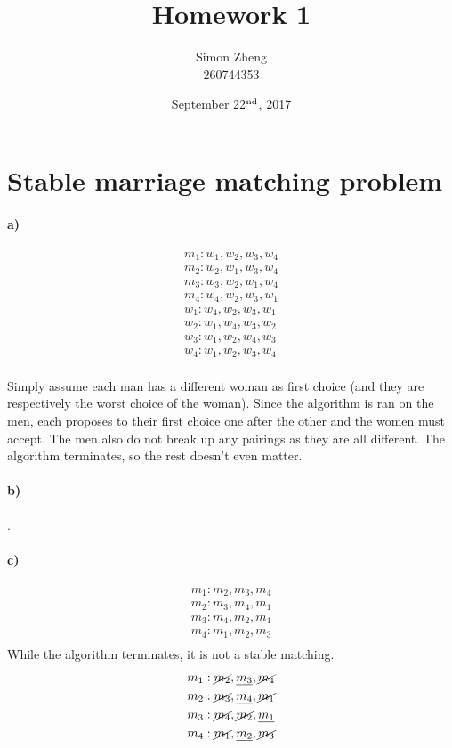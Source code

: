\documentclass[11pt,letterpaper]{article}
\author{Simon Zheng\\260744353}
\title{Homework 1}
\date{September 22$^{\textnormal{nd}}$, 2017}
\begin{document}
	\maketitle
	\thispagestyle{fancy}
	
	\section{Stable marriage matching problem}
	
		\paragraph{a)}
		\begin{align*}
		m_1 : w_1 , w_2 , w_3 , w_4 \\
		m_2 : w_2 , w_1 , w_3 , w_4 \\
		m_3 : w_3 , w_2 , w_1 , w_4 \\
		m_4 : w_4 , w_2 , w_3 , w_1 \\
		w_1 : w_4 , w_2 , w_3 , w_1 \\
		w_2 : w_1 , w_4 , w_3 , w_2 \\
		w_3 : w_1 , w_2 , w_4 , w_3 \\
		w_4 : w_1 , w_2 , w_3 , w_4 \\
		\end{align*}
    
    Simply assume each man has a different woman as first choice (and they are respectively the worst choice of the woman). Since the algorithm is ran on the men, each proposes to their first choice one after the other and the women must accept. The men also do not break up any pairings as they are all different. The algorithm terminates, so the rest doesn't even matter.
		
		\paragraph{b)}
		.
		
		\paragraph{c)}
		\begin{align*}
		m_1 : m_2 , m_3 , m_4 \\
		m_2 : m_3 , m_4 , m_1 \\
		m_3 : m_4 , m_2 , m_1 \\
		m_4 : m_1 , m_2 , m_3 \\
		\end{align*}
		While the algorithm terminates, it is not a stable matching.
		\begin{align*}
		m_1 : \cancel{m_2} , \underline{m_3} , \cancel{m_4} \\
		m_2 : \cancel{m_3} , \underline{m_4} , \cancel{m_1} \\
		m_3 : \cancel{m_4} , \cancel{m_2} , \underline{m_1} \\
		m_4 : \cancel{m_1} , \underline{m_2} , \cancel{m_3} \\
		\end{align*}
		
\end{document}
